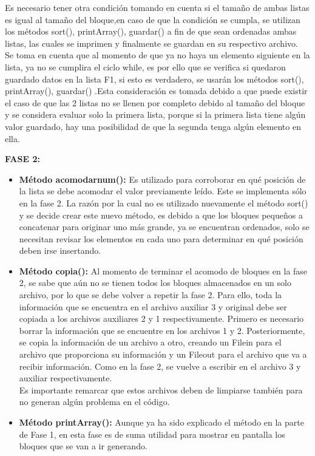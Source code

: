 \documentclass[12pt,letterpaper]{article}
\begin{document}
\begin{large}
\begin{itemize}[noitemsep,topsep=0pt]
Es necesario tener otra condición tomando en cuenta si el tamaño de ambas listas es igual al tamaño del bloque,en caso de que la condición se cumpla, se utilizan los métodos sort(), printArray(), guardar() a fin de que sean ordenadas ambas listas, las cuales se imprimen y finalmente se guardan en su respectivo archivo. \\
Se toma en cuenta que al momento de que ya no haya un elemento siguiente en la lista, ya no se cumplira el ciclo while, es por ello que se verifica si quedaron guardado datos en la lista F1, si esto es verdadero, se usarán los métodos sort(), printArray(), guardar() .Esta consideración es tomada debido a que puede existir el caso de que las 2 listas no se llenen por completo debido al tamaño del bloque y se considera evaluar solo la primera lista, porque si la primera lista tiene algún valor guardado, hay una posibilidad de que la segunda tenga algún elemento en ella.
\end{itemize}
\textbf{FASE 2:}
\begin{itemize}[noitemsep,topsep=0pt]
\item\textbf{Método acomodarnum():} Es utilizado para corroborar en qué posición de la lista se debe acomodar el valor previamente leído. Este se implementa sólo en la fase 2. La razón por la cual no es utilizado nuevamente el método sort() y se decide crear este nuevo método, es debido a que los bloques pequeños a concatenar para originar uno más grande, ya se encuentran ordenados, solo se necesitan revisar los elementos en cada uno para determinar en qué posición deben irse insertando.
\item\textbf{Método copia():} Al momento de terminar el acomodo de bloques en la fase 2, se sabe que aún no se tienen todos los bloques almacenados en un solo archivo, por lo que se debe volver a repetir la fase 2. Para ello, toda la información que se encuentra en el archivo auxiliar 3 y original debe ser copiada a los archivos auxiliares 2 y 1 respectivamente. Primero es necesario borrar la información que se encuentre en los archivos 1 y 2. Posteriormente, se copia la información de un archivo a otro, creando un Filein para el archivo que proporciona su información y un Fileout para el  archivo que va a recibir información. Como en la fase 2, se vuelve a escribir en el archivo 3 y auxiliar respectivamente.\\
 Es importante remarcar que estos archivos deben de limpiarse también para no generan algún problema en el código.
\item\textbf{Método printArray():} Aunque ya ha sido explicado el método en la parte de Fase 1, en esta fase es de suma utilidad para mostrar en pantalla los bloques que se van a ir generando.

\end{itemize}
\end{large}
\end{document}
